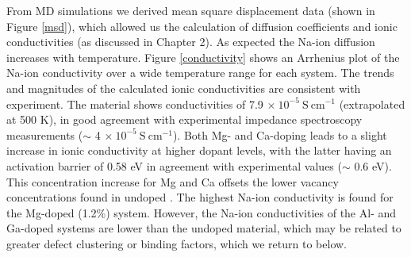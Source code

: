\documentclass[12pt]{report}
\begin{document}
From MD simulations we derived mean square displacement data (shown in Figure \ref{msd}), which allowed us the calculation of diffusion coefficients and ionic conductivities (as discussed in Chapter 2).
As expected the Na-ion diffusion increases with temperature.
Figure \ref{conductivity} shows an Arrhenius plot of the Na-ion conductivity over a wide temperature range for each system. 
The trends and magnitudes of the calculated ionic conductivities are consistent with experiment. 
The  material shows conductivities of 7.9 $\mathrm{\times \ 10^{-5} \ S \ cm^{-1}}$ (extrapolated at 500 K), in good agreement with experimental impedance spectroscopy measurements ($\mathrm{\sim}$ 4 $\mathrm{\times \ 10^{-5} \ S \ cm^{-1}}$).\cite{wang2015a}
Both Mg- and Ca-doping leads to a slight increase in ionic conductivity at higher dopant levels, with the latter having an activation barrier of 0.58 eV in agreement with experimental values ($\mathrm{\sim}$ 0.6 eV).\cite{wang2015a}
This concentration increase for Mg and Ca offsets the lower vacancy concentrations found in undoped . 
The highest Na-ion conductivity is found for the Mg-doped (1.2\%) system. 
However, the Na-ion conductivities of the Al- and Ga-doped systems are lower than the undoped material, which may be related to greater defect clustering or binding factors, which we return to below. 
\end{document}
